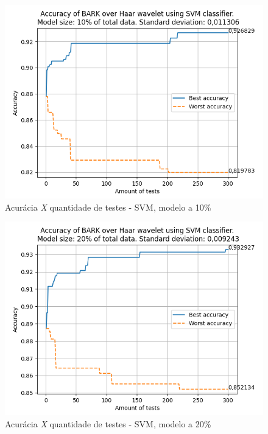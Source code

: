 			
		
			\newpage
			\begin{figure}
				\centering
				\includegraphics{images/results/confusionMatrices/classifier_SVM_10.png}
				\caption{Acurácia \textit{X} quantidade de testes - SVM, modelo a 10\%}
				\label{fig:classifiersvm10}
			\end{figure}
			
		
			\newpage
			\begin{figure}
				\centering
				\includegraphics{images/results/confusionMatrices/classifier_SVM_20.png}
				\caption{Acurácia \textit{X} quantidade de testes - SVM, modelo a 20\%}
				\label{fig:classifiersvm20}
			\end{figure}
			
			
